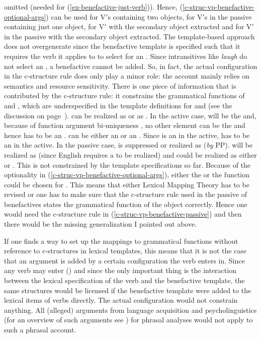omitted (needed for (\ref{ex-benefactive-just-verb})). Hence,
(\ref{c-struc-vp-benefactive-optional-args}) can be used for V$'$s containing two objects, for V$'$s
in the passive containing just one object, for V$'$ with the secondary object extracted and for V$'$
in the passive with the secondary object extracted. The template-based approach does not
overgenerate since the benefactive template is specified such that it requires the verb it applies
to to select for an \argtwo. Since intransitives like \emph{laugh} do not select an \argtwo, a
benefactive cannot be added. So, in fact, the actual configuration in the c-structure rule does only
play a minor role: the account mainly relies on semantics and resource sensitivity. There is one
piece of information that is contributed by the c-structure rule: it constrains the grammatical
functions of \argtwo and \argthree, which are underspecified in the template definitions for \argtwo
and \argthree (see the discussion on page~\pageref{page-disjunctions-gf-c-structure}). \argtwo can
be realized as \subjlfg or as \obj. In the active case, \argone will be the \subjlfg and, because of function argument bi-uniqueness \citep[]{BATW2015a}, no other element can be the \subjlfg and hence \argtwo has to
be an \obj. \argthree can be either an \obj or an \objtheta. Since \argtwo is an \obj in the active,
\argthree has to be an \objtheta in the active. In the passive case, \argone is suppressed or
realized as \obltheta (\emph{by} PP). \argtwo will be realized as \subjlfg (since English requires a \subjlfg to be realized) and \argthree could be realized as either
\obj or \objtheta. This is not constrained by the template specifications so far. Because of the
optionality in (\ref{c-struc-vp-benefactive-optional-args}), either the \obj or the \objtheta
function could be chosen for \argthree. This means that either Lexical Mapping Theory has to be
revised or one has to make sure that the c-structure rule used in the passive of benefactives states the grammatical
function of the object correctly. Hence one would need the c-structure rule in
(\ref{c-struc-vp-benefactive-passive}) and then there would be the missing generalization I pointed
out above.

If one finds a way to set up the mappings to grammatical functions without reference to c-structures
in lexical templates, this means that it is not the case that an argument is added by
a certain configuration the verb enters in. Since any verb may enter () and since the only
important thing is the interaction between the lexical specification of the verb and the benefactive
template, the same structures would be licensed if the benefactive template were added to the
lexical items of verbs directly. The actual configuration would not constrain anything. All (alleged) arguments
from language acquisition and psycholinguistics (for an overview of such arguments see ) for phrasal analyses would not apply to such a phrasal account.

